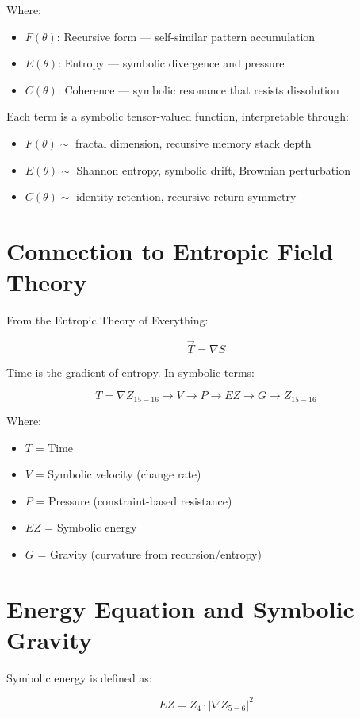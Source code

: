 \documentclass[12pt]{article}
\begin{document}
Where:
\begin{itemize}
  \item $F(\theta)$: Recursive form — self-similar pattern accumulation
  \item $E(\theta)$: Entropy — symbolic divergence and pressure
  \item $C(\theta)$: Coherence — symbolic resonance that resists dissolution
\end{itemize}

Each term is a symbolic tensor-valued function, interpretable through:
\begin{itemize}
  \item $F(\theta) \sim$ fractal dimension, recursive memory stack depth
  \item $E(\theta) \sim$ Shannon entropy, symbolic drift, Brownian perturbation
  \item $C(\theta) \sim$ identity retention, recursive return symmetry
\end{itemize}

\section{Connection to Entropic Field Theory}

From the Entropic Theory of Everything:

\[
\vec{T} = \nabla S
\]

Time is the gradient of entropy. In symbolic terms:

\[
T = \nabla Z_{15-16} \rightarrow V \rightarrow P \rightarrow EZ \rightarrow G \rightarrow Z_{15-16}
\]

Where:
\begin{itemize}
  \item $T$ = Time
  \item $V$ = Symbolic velocity (change rate)
  \item $P$ = Pressure (constraint-based resistance)
  \item $EZ$ = Symbolic energy
  \item $G$ = Gravity (curvature from recursion/entropy)
\end{itemize}

\section{Energy Equation and Symbolic Gravity}

Symbolic energy is defined as:

\[
EZ = Z_4 \cdot |\nabla Z_{5-6}|^2
\]
\end{document}
